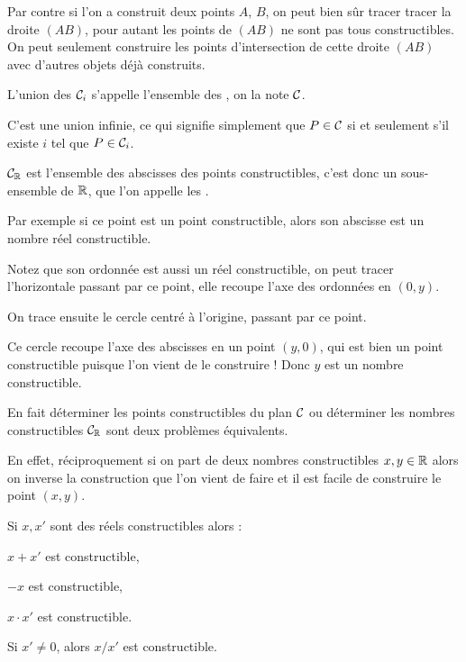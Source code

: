 Par contre  si l'on a construit deux points $A$, $B$, on peut bien sûr tracer tracer la droite $(AB)$, 
pour autant les points de $(AB)$ ne sont pas tous constructibles. 
On peut seulement construire les points d'intersection de cette droite $(AB)$ avec d'autres objets déjà 
construits.


\diapo

L'union  des $\mathcal{C}_i$ s'appelle l'ensemble des , on la note 
 $\mathcal{C}$.

\change
C'est une union infinie, ce qui signifie simplement que 
$P \in \mathcal{C}$ si et seulement s'il existe $i$ tel que $P \in \mathcal{C}_i$.


\change

$\mathcal{C}_{\mathbb{R}}$ est l'ensemble des abscisses des points constructibles, c'est donc un sous-ensemble de $\mathbb{R}$, 
que l'on appelle les .  


\change
Par exemple si ce point est un point constructible,
alors son abscisse est un nombre réel constructible.

\change
Notez que son ordonnée est aussi un réel constructible, on peut tracer l'horizontale passant par ce point,
elle recoupe l'axe des ordonnées en $(0,y)$.

\change
On trace ensuite le cercle centré à l'origine, passant par ce point.

\change
Ce cercle recoupe l'axe des abscisses en un point $(y,0)$, qui est bien un point constructible puisque l'on vient de le construire !
Donc $y$ est un nombre constructible.

\change
En fait déterminer les points constructibles du plan $\mathcal{C}$ ou déterminer 
les nombres constructibles $\mathcal{C}_{\mathbb{R}}$ sont deux problèmes équivalents.


En effet, réciproquement si on part de deux nombres constructibles $x,y \in \mathbb{R}$ alors on inverse
la construction que l'on vient de faire et il est facile de construire le point $(x,y)$.


\diapo

Si $x, x'$ sont des réels constructibles alors :

\change
$x+x'$ est constructible,
 
\change
$-x$ est constructible,

\change
$x \cdot x'$ est constructible.

\change
Si $x' \neq 0$, alors $x/x'$ est constructible.


